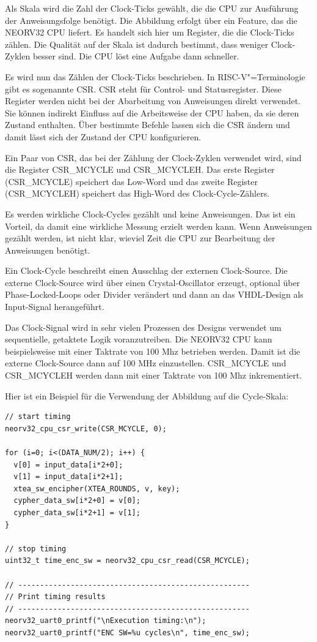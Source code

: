 Als Skala wird die Zahl der Clock-Ticks gewählt, die die CPU zur Ausführung der Anweisungsfolge benötigt. Die Abbildung erfolgt über ein Feature, das die NEORV32 CPU liefert. Es handelt sich hier um Register, die die Clock-Ticks zählen. Die Qualität auf der Skala ist dadurch bestimmt, dass weniger Clock-Zyklen besser sind. Die CPU löst eine Aufgabe dann schneller.

Es wird nun das Zählen der Clock-Ticks beschrieben. In RISC-V"=Terminologie gibt es sogenannte \gls{CSR}. CSR steht für Control- und Statusregister. Diese Register werden nicht bei der Abarbeitung von Anweisungen direkt verwendet. Sie können indirekt Einfluss auf die Arbeitsweise der CPU haben, da sie deren Zustand enthalten. Über bestimmte Befehle lassen sich die CSR ändern und damit lässt sich der Zustand der CPU konfigurieren.

Ein Paar von CSR, das bei der Zählung der Clock-Zyklen verwendet wird, sind die Register CSR\_MCYCLE und CSR\_MCYCLEH. Das erste Register (CSR\_MCYCLE) speichert das Low-Word und das zweite Register (CSR\_MCYCLEH) speichert das High-Word des Clock-Cycle-Zählers.

Es werden wirkliche Clock-Cycles gezählt und keine Anweisungen. Das ist ein Vorteil, da damit eine wirkliche Messung erzielt werden kann. Wenn Anweisungen gezählt werden, ist nicht klar, wieviel Zeit die CPU zur Bearbeitung der Anweisungen benötigt.

Ein Clock-Cycle beschreibt einen Ausschlag der externen Clock-Source. Die externe Clock-Source wird über einen Crystal-Oscillator erzeugt, optional über Phase-Locked-Loops oder Divider verändert und dann an das VHDL-Design als Input-Signal herangeführt.

Das Clock-Signal wird in sehr vielen Prozessen des Designs verwendet um sequentielle, getaktete Logik voranzutreiben. Die NEORV32 CPU kann beispielsweise mit einer Taktrate von 100 Mhz betrieben werden. Damit ist die externe Clock-Source dann auf 100 MHz einzustellen. CSR\_MCYCLE und CSR\_MCYCLEH werden dann mit einer Taktrate von 100 Mhz inkrementiert.

Hier ist ein Beispiel für die Verwendung der Abbildung auf die Cycle-Skala:

\begin{lstlisting}[style=PseudoLang,caption={Verwendung der Timing-Register},captionpos=b]
// start timing
neorv32_cpu_csr_write(CSR_MCYCLE, 0);

for (i=0; i<(DATA_NUM/2); i++) {
  v[0] = input_data[i*2+0];
  v[1] = input_data[i*2+1];
  xtea_sw_encipher(XTEA_ROUNDS, v, key);
  cypher_data_sw[i*2+0] = v[0];
  cypher_data_sw[i*2+1] = v[1];
}

// stop timing
uint32_t time_enc_sw = neorv32_cpu_csr_read(CSR_MCYCLE);

// -----------------------------------------------------
// Print timing results
// -----------------------------------------------------
neorv32_uart0_printf("\nExecution timing:\n");
neorv32_uart0_printf("ENC SW=%u cycles\n", time_enc_sw);
\end{lstlisting}

